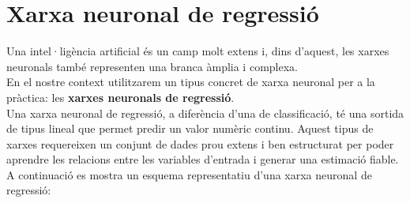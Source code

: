 \section{Xarxa neuronal de regressió}\label{sec:op}
Una intel·ligència artificial és un camp molt extens i, dins d’aquest, les xarxes neuronals també representen una branca àmplia i complexa. \\
En el nostre context utilitzarem un tipus concret de xarxa neuronal per a la pràctica: les \textbf{xarxes neuronals de regressió}.\\

Una xarxa neuronal de regressió, a diferència d’una de classificació, té una sortida de tipus lineal que permet predir un valor numèric continu. Aquest tipus de xarxes requereixen un conjunt de dades prou extens i ben estructurat per poder aprendre les relacions entre les variables d’entrada i generar una estimació fiable.\\

A continuació es mostra un esquema representatiu d’una xarxa neuronal de regressió:


